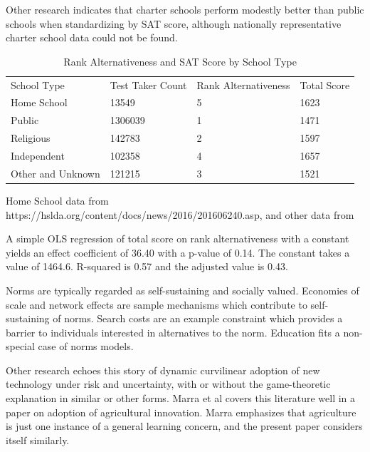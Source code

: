 \documentclass[AER]{./aea-latex-templates/AEA}
\begin{document}
        Other research indicates that charter schools\cite{di2011evidence} perform modestly better than
        public schools when standardizing by SAT score, although nationally
        representative charter school data could not be found.
        
        \begin{table}
        \caption{Rank Alternativeness and SAT Score by School Type}
        \begin{tabular}{llll}
        School Type & Test Taker Count & Rank Alternativeness & Total Score \\
        Home School & 13549 & 5 & 1623 \\
        Public & 1306039 & 1 & 1471 \\
        Religious & 142783 & 2 & 1597 \\
        Independent & 102358 & 4 & 1657 \\
        Other and Unknown & 121215 & 3 & 1521 %
        \end{tabular}
        \begin{tablenotes}[Source]
        Home School data from https://hslda.org/content/docs/news/2016/201606240.asp,
        and other data from \cite{collegeboard_2014} %
        \end{tablenotes}
        \label{tab:rank_alt_and_sat_by_school_type}
        \end{table}
        
        A simple OLS regression of total score on rank alternativeness with a
        constant yields an effect coefficient of 36.40 with a p-value of 0.14. The
        constant takes a value of 1464.6. R-squared is 0.57 and the adjusted value
        is 0.43.
        
        Norms are typically regarded as self-sustaining and socially
        valued\cite{dequech2006institutions}. Economies of scale and
        network effects are sample mechanisms which contribute to
        self-sustaining of norms. Search costs are an example constraint
        which provides a barrier to individuals interested in alternatives
        to the norm. Education fits a non-special case of norms models.
        
        Other research echoes this story of dynamic curvilinear adoption of new
        technology under risk and uncertainty, with or without the game-theoretic
        explanation in similar or other forms. Marra et al covers this literature
        well in a paper on adoption of agricultural innovation\cite{marra2003economics}. Marra emphasizes
        that agriculture is just one instance of a general learning concern, and
        the present paper considers itself similarly.
        
\end{document}
